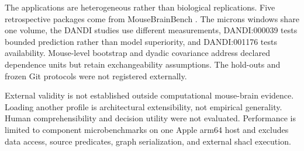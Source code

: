 The applications are heterogeneous rather than biological replications. Five retrospective packages come from MouseBrainBench \citep{fernandezisabel2026mousebrainbench}. The \ac{microns} windows share one volume, the DANDI studies use different measurements, DANDI:000039 tests bounded prediction rather than model superiority, and DANDI:001176 tests availability. Mouse-level bootstrap and dyadic covariance address declared dependence units but retain exchangeability assumptions. The hold-outs and frozen Git protocols were not registered externally.

External validity is not established outside computational mouse-brain evidence. Loading another profile is architectural extensibility, not empirical generality. Human comprehensibility and decision utility were not evaluated. Performance is limited to component microbenchmarks on one Apple arm64 host and excludes data access, source predicates, graph serialization, and external \ac{shacl} execution.
